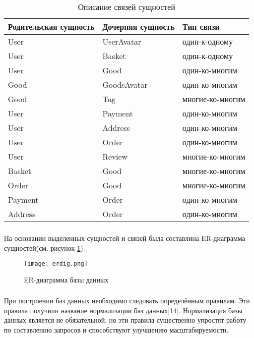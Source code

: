 \begin{longtable}{ | l | l | l | }
    \caption{Описание связей сущностей}
    \label{opisanie:suw}
    \endfirsthead
    \endhead
    \hline
    Родительская сущность & Дочерняя сущность & Тип связи  \\ \hline
    User & UserAvatar & один-к-одному \\ \hline
    User & Basket & один-к-одному \\ \hline
    User & Good & один-ко-многим \\ \hline
    Good & GoodsAvatar & один-ко-многим \\ \hline
    Good & Tag & многие-ко-многим \\ \hline
    User & Payment & один-ко-многим \\ \hline
    User & Address & один-ко-многим \\ \hline
    User & Order & один-ко-многим \\ \hline
    User & Review & многие-ко-многим \\ \hline
    Basket & Good & многие-ко-многим \\ \hline
    Order & Good & многие-ко-многим  \\ \hline
    Payment & Order & один-ко-многим \\ \hline
    Address & Order & один-ко-многим \\
    \hline
\end{longtable}

\subsubsection{}

На основании выделенных сущностей и связей была составлина ER-диаграмма сущностей(см. рисунок \ref{db:erdiag}).

\begin{figure}[!h]
    \centering
    \texttt{[image: erdig.png]}
    \caption{ER-диаграмма базы данных}
    \label{db:erdiag}
\end{figure}

\subsubsection{}

При построении баз данных необходимо следовать определённым правилам.
Эти правила получили название нормализации баз данных[14].
Нормализация базы данных является не обязательной, но эти правила существенно упростят работу по составлению запросов и способствуют улучшению масштабируемости.

